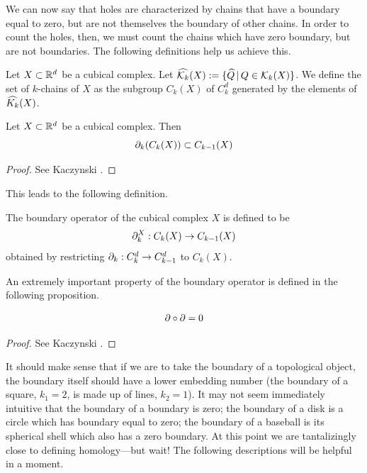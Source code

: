 We can now say that holes are characterized by chains that have a boundary equal to zero, but are not themselves the boundary of other chains. In order to count the holes, then, we must count the chains which have zero boundary, but are not boundaries. The following definitions help us achieve this.

\begin{defn}
	Let $X \subset \mathbb{R}^d$ be a cubical complex. Let $\widehat{\mathcal{K}_k}(X) := \{ \widehat{Q} \, | \, Q \in \mathcal{K}_k(X) \}$. We define the set of $k$-chains of $X$ as the subgroup $C_k(X)$ of $C_k^d$ generated by the elements of $\widehat{K_k}(X)$.
\end{defn}

\begin{prop}
	Let $X \subset \mathbb{R}^d$ be a cubical complex. Then
	$$ \partial_k (C_k(X)) \subset C_{k-1}(X) $$
\end{prop}

\begin{proof}
	See Kaczynski \etal{}.
\end{proof}
%
This leads to the following definition.

\begin{defn}
	The boundary operator of the cubical complex $X$ is defined to be
	$$ \partial_k^X : C_k(X) \rightarrow C_{k-1}(X) $$
	obtained by restricting $\partial_k : C_k^d \rightarrow C_{k-1}^d$ to $C_k(X)$.
\end{defn}

An extremely important property of the boundary operator is defined in the following proposition.

\begin{prop} \label{prop:bdofbd}
	$$\partial \circ \partial = 0$$
\end{prop}

\begin{proof}
	See Kaczynski \etal{}.
\end{proof}

It should make sense that if we are to take the boundary of a topological object, the boundary itself should have a lower embedding number (the boundary of a square, $k_1=2$, is made up of lines, $k_2=1$). It may not seem immediately intuitive that the boundary of a boundary is zero; the boundary of a disk is a circle which has boundary equal to zero; the boundary of a baseball is its spherical shell which also has a zero boundary. At this point we are tantalizingly close to defining homology---but wait! The following descriptions will be helpful in a moment.

